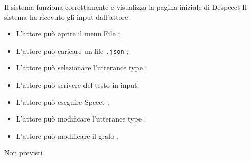 \documentclass[../AnalisideiRequisiti.tex]{subfiles}
\begin{document}
	{Il sistema funziona correttamente e visualizza la pagina iniziale di Despeect}
	{Il sistema ha ricevuto gli input dall'attore}
	{\begin{itemize}
			\item{} L'attore può aprire il menu File ;
			\item{} L'attore può caricare un file \verb|.json| ;
			\item{} L'attore può selezionare l'utterance type ;
			\item{} L'attore può scrivere del testo in input;
			\item{} L'attore può eseguire Speect ;
			\item{} L'attore può modificare l'utterance type .
			\item{} L'attore può modificare il grafo .
	\end{itemize}}
	{Non previsti}
	
	
\end{document}
